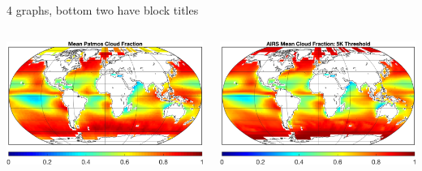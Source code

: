 \documentclass[10pt,t]{beamer}
\begin{document}
\begin{frame}[label={sec:org409cb32}]{4 graphs, bottom two have block titles}
\vspace{-0.6in}
\begin{columns}
\begin{column}{0.55\columnwidth}
\begin{block}{}
\begin{center}
\includegraphics[width=\linewidth]{./Figs/patmos_mean_cloud_frac.png}
\end{center}
\end{block}
\end{column}

\begin{column}{0.55\columnwidth}
\begin{block}{}
\begin{center}
\includegraphics[width=\linewidth]{./Figs/airs_mean_cloud_frac_true5K_threshold.png}
\end{center}
\end{block}
\end{column}
\end{columns}


\end{frame}
\end{document}
